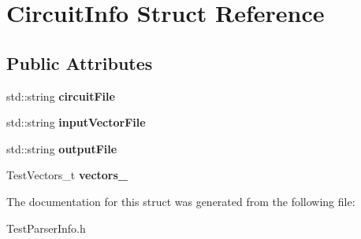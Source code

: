 \hypertarget{structCircuitInfo}{}\section{Circuit\+Info Struct Reference}
\label{structCircuitInfo}
\subsection*{Public Attributes}
\begin{DoxyCompactItemize}
\item 
std\+::string {\bfseries circuit\+File}\hypertarget{structCircuitInfo_a4f7b8ae884ab2e7369d0707741886457}{}\label{structCircuitInfo_a4f7b8ae884ab2e7369d0707741886457}

\item 
std\+::string {\bfseries input\+Vector\+File}\hypertarget{structCircuitInfo_af4be7f92034f150f19fc25999d66c44f}{}\label{structCircuitInfo_af4be7f92034f150f19fc25999d66c44f}

\item 
std\+::string {\bfseries output\+File}\hypertarget{structCircuitInfo_a4c6698714e4faab0b11ca3df6c166f94}{}\label{structCircuitInfo_a4c6698714e4faab0b11ca3df6c166f94}

\item 
Test\+Vectors\+\_\+t {\bfseries vectors\+\_\+}\hypertarget{structCircuitInfo_a97e2f52a14b8f62282c9ce363f1f57f7}{}\label{structCircuitInfo_a97e2f52a14b8f62282c9ce363f1f57f7}

\end{DoxyCompactItemize}


The documentation for this struct was generated from the following file\+:\begin{DoxyCompactItemize}
\item 
Test\+Parser\+Info.\+h\end{DoxyCompactItemize}
